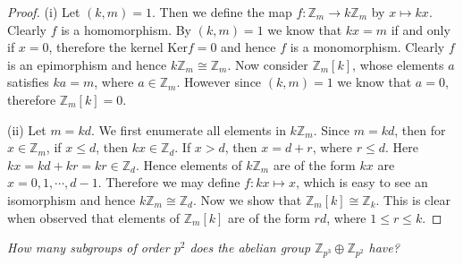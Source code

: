 \begin{proof}
(i) Let $(k,m)=1$. Then we define the map $f:\mathbb{Z}_m\to k\mathbb{Z}_m$ by $x\mapsto kx$. Clearly $f$ is a homomorphism. By $(k,m)=1$ we know that $kx=m$ if and only if $x=0$, therefore the kernel $\mathrm{Ker}f=0$ and hence $f$ is a monomorphism. Clearly $f$ is an epimorphism and hence $k\mathbb{Z}_m\cong\mathbb{Z}_m$. Now consider $\mathbb{Z}_m[k]$, whose elements $a$ satisfies $ka=m$, where $a\in\mathbb{Z}_m$. However since $(k,m)=1$ we know that $a=0$, therefore $\mathbb{Z}_m[k]=0$.\par
(ii) Let $m=kd$. We first enumerate all elements in $k\mathbb{Z}_m$. Since $m=kd$, then for $x\in\mathbb{Z}_m$, if $x\le d$, then $kx\in\mathbb{Z}_d$. If $x>d$, then $x=d+r$, where $r\le d$. Here $kx=kd+kr=kr\in\mathbb{Z}_d$. Hence elements of $k\mathbb{Z}_m$ are of the form $kx$ are $x=0,1,\cdots,d-1$. Therefore we may define $f:kx\mapsto x$, which is easy to see an isomorphism and hence $k\mathbb{Z}_m\cong\mathbb{Z}_d$. Now we show that $\mathbb{Z}_m[k]\cong\mathbb{Z}_k$. This is clear when observed that elements of  $\mathbb{Z}_m[k]$ are of the form $rd$, where $1\le r\le k$.
\end{proof}
\begin{problem}\em
How many subgroups of order $p^2$ does the abelian group $\mathbb{Z}_{p^3}\oplus\mathbb{Z}_{p^2}$ have?
\end{problem}
